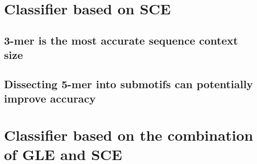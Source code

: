 

\section{Classifier based on SCE}\label{ml:sce}

\subsection{3-mer is the most accurate sequence context size}

\subsection{Dissecting 5-mer into submotifs can potentially improve accuracy}

\section{Classifier based on the combination of GLE and SCE}\label{ml:both}